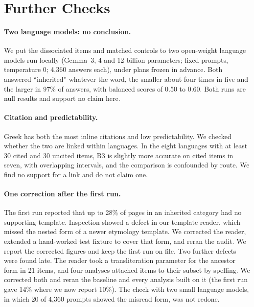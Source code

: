 \documentclass[11pt]{article}
\begin{document}
\section{Further Checks}
\label{app:further}

\paragraph{Two language models: no conclusion.} We put the dissociated items and matched controls to two open-weight language models run locally (Gemma~3, 4 and 12 billion parameters; fixed prompts, temperature 0; 4,360 answers each), under plans frozen in advance. Both answered ``inherited'' whatever the word, the smaller about four times in five and the larger in 97\% of answers, with balanced scores of 0.50 to 0.60. Both runs are null results and support no claim here.

\paragraph{Citation and predictability.} Greek has both the most inline citations and low predictability. We checked whether the two are linked within languages. In the eight languages with at least 30 cited and 30 uncited items, B3 is slightly more accurate on cited items in seven, with overlapping intervals, and the comparison is confounded by route. We find no support for a link and do not claim one.

\paragraph{One correction after the first run.} The first run reported that up to 28\% of pages in an inherited category had no supporting template. Inspection showed a defect in our template reader, which missed the nested form of a newer etymology template. We corrected the reader, extended a hand-worked test fixture to cover that form, and reran the audit. We report the corrected figures and keep the first run on file. Two further defects were found late. The reader took a transliteration parameter for the ancestor form in 21 items, and four analyses attached items to their subset by spelling. We corrected both and reran the baseline and every analysis built on it (the first run gave 14\% where we now report 10\%). The check with two small language models, in which 20 of 4,360 prompts showed the misread form, was not redone.
\end{document}
